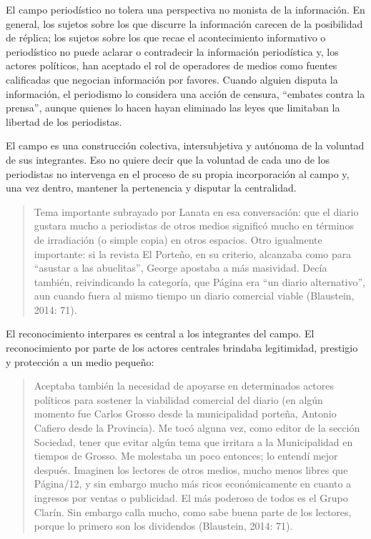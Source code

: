 El campo periodístico no tolera una perspectiva no monista de la información. En general, los sujetos sobre los que discurre la información carecen de la posibilidad de réplica; los sujetos sobre los que recae el acontecimiento informativo o periodístico no puede aclarar o contradecir la información periodística y, los actores políticos, han aceptado el rol de operadores de medios como fuentes calificadas que negocian información por favores. Cuando alguien disputa la información, el periodismo lo considera una acción de censura, \enquote{embates contra la prensa}, aunque quienes lo hacen hayan eliminado las leyes que limitaban la libertad de los periodistas.

El campo es una construcción colectiva, intersubjetiva y autónoma de la voluntad de sus integrantes. Eso no quiere decir que la voluntad de cada uno de los periodistas no intervenga en el proceso de su propia incorporación al campo y, una vez dentro, mantener la pertenencia y disputar la centralidad.

\begin{quote}
Tema importante subrayado por Lanata en esa conversación: que el diario gustara mucho a periodistas de otros medios significó mucho en términos de irradiación (o simple copia) en otros espacios. Otro igualmente importante: si la revista El Porteño, en su criterio, alcanzaba como para \enquote{asustar a las abuelitas}, George apostaba a más masividad. Decía también, reivindicando la categoría, que Página era \enquote{un diario alternativo}, aun cuando fuera al mismo tiempo un diario comercial viable (Blaustein, 2014: 71).
\end{quote}

El reconocimiento interpares es central a los integrantes del campo. El reconocimiento por parte de los actores centrales brindaba legitimidad, prestigio y protección a un medio pequeño:

\begin{quote}
Aceptaba también la necesidad de apoyarse en determinados actores políticos para sostener la viabilidad comercial del diario (en algún momento fue Carlos Grosso desde la municipalidad porteña, Antonio Cafiero desde la Provincia). Me tocó alguna vez, como editor de la sección Sociedad, tener que evitar algún tema que irritara a la Municipalidad en tiempos de Grosso. Me molestaba un poco entonces; lo entendí mejor después. Imaginen los lectores de otros medios, mucho menos libres que Página/12, y sin embargo mucho más ricos económicamente en cuanto a ingresos por ventas o publicidad. El más poderoso de todos es el Grupo Clarín. Sin embargo calla mucho, como sabe buena parte de los lectores, porque lo primero son los dividendos (Blaustein, 2014: 71).
\end{quote}

